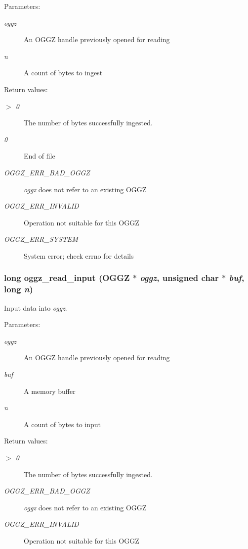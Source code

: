\begin{Desc}
\item[Parameters:]
\begin{description}
\item[{\em oggz}]An OGGZ handle previously opened for reading \item[{\em n}]A count of bytes to ingest \end{description}
\end{Desc}
\begin{Desc}
\item[Return values:]
\begin{description}
\item[{\em $>$  0}]The number of bytes successfully ingested. \item[{\em 0}]End of file \item[{\em OGGZ\_\-ERR\_\-BAD\_\-OGGZ}]{\em oggz\/} does not refer to an existing OGGZ \item[{\em OGGZ\_\-ERR\_\-INVALID}]Operation not suitable for this OGGZ \item[{\em OGGZ\_\-ERR\_\-SYSTEM}]System error; check errno for details \end{description}
\end{Desc}
\subsubsection{\setlength{\rightskip}{0pt plus 5cm}long oggz\_\-read\_\-input ({\bf OGGZ} $\ast$ {\em oggz}, unsigned char $\ast$ {\em buf}, long {\em n})}\label{group__read__api_a3}


Input data into {\em oggz\/}. 

\begin{Desc}
\item[Parameters:]
\begin{description}
\item[{\em oggz}]An OGGZ handle previously opened for reading \item[{\em buf}]A memory buffer \item[{\em n}]A count of bytes to input \end{description}
\end{Desc}
\begin{Desc}
\item[Return values:]
\begin{description}
\item[{\em $>$  0}]The number of bytes successfully ingested. \item[{\em OGGZ\_\-ERR\_\-BAD\_\-OGGZ}]{\em oggz\/} does not refer to an existing OGGZ \item[{\em OGGZ\_\-ERR\_\-INVALID}]Operation not suitable for this OGGZ \end{description}
\end{Desc}
